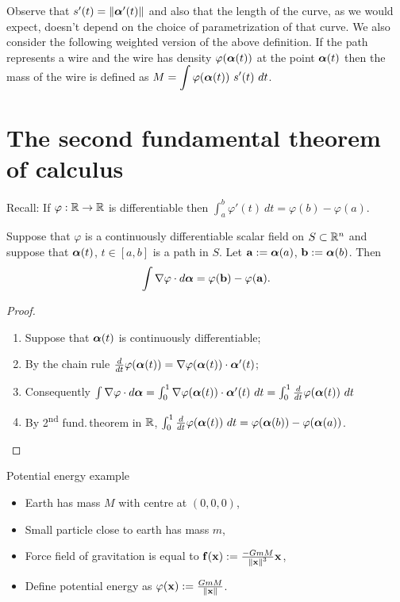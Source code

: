 Observe that \(s'(t) = \left\|\boldsymbol{\alpha}'(t)\right\| \) and also that the length of the curve, as we would expect, doesn't depend on the choice of parametrization of that curve.
We also consider the following weighted version of the above definition.
If the path represents a wire and the wire has density \(\varphi(\boldsymbol{\alpha}(t))\) at the point \(\boldsymbol{\alpha}(t)\) then the mass of the wire is defined as
\(M = \displaystyle\int \varphi(\boldsymbol{\alpha}(t)) \ s'(t) \ dt\).


\section{The second fundamental theorem of calculus}

 {Recall:}
If \(\varphi:\mathbb{R} \to \mathbb{R}\) is differentiable then
\(\int_a^b \varphi'(t) \ dt = \varphi(b) - \varphi(a)\).

\begin{theorem}
    Suppose that \(\varphi\) is a continuously differentiable scalar field on \(S \subset \mathbb{R}^n\)
    and suppose that \(\boldsymbol{\alpha}(t)\), \(t\in[a,b]\) is a path in \(S\).
    Let \(\mathbf{a}:= \boldsymbol{\alpha}(a)\),  \(\mathbf{b}:= \boldsymbol{\alpha}(b)\).
    Then
    \[
        \int \nabla \varphi \cdot d\boldsymbol{\alpha} = \varphi(\mathbf{b}) - \varphi(\mathbf{a}).
    \]
\end{theorem}

\begin{proof}
    \begin{enumerate}
        \item Suppose that \(\boldsymbol{\alpha}(t)\) is continuously differentiable;
        \item By the chain rule \(\frac{d}{dt} \varphi(\boldsymbol{\alpha}(t)) = \nabla \varphi(\boldsymbol{\alpha}(t))\cdot \boldsymbol{\alpha}'(t)\);
        \item Consequently \(\int \nabla \varphi \cdot d\aalpha
              = \int_0^1 \nabla \varphi(\aalpha(t)) \cdot \aalpha'(t)\ dt
              = \int_0^1 \tfrac{d}{dt} \varphi(\aalpha(t)) \ dt \)
        \item By 2\textsuperscript{nd} fund.\,theorem in \(\mathbb{R}\),
              \(\int_0^1 \tfrac{d}{dt} \varphi(\boldsymbol{\alpha}(t)) \ dt = \varphi(\boldsymbol{\alpha}(b)) - \varphi(\boldsymbol{\alpha}(a))\).
    \end{enumerate}
\end{proof}




{Potential energy example}

\begin{itemize}
    \item Earth has mass \(M\) with centre at \((0,0,0)\),
    \item Small particle close to earth has mass \(m\),
    \item Force field of gravitation is equal to
          \(\mathbf{f}(\mathbf{x}) := \frac{-GmM}{\left\|\mathbf{x}\right\|^3}\mathbf{x}\),
    \item Define potential energy as
          \(\varphi(\mathbf{x}):= \frac{GmM}{\left\|\mathbf{x}\right\|}\).
\end{itemize}

